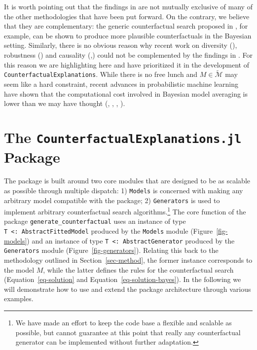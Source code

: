 \documentclass{juliacon}
\begin{document}
It is worth pointing out that the findings in \cite{schut2021generating}
are not mutually exclusive of many of the other methodologies that have
been put forward. On the contrary, we believe that they are
complementary: the generic counterfactual search proposed in
\cite{wachter2017counterfactual}, for example, can be shown to produce
more plausible counterfactuals in the Bayesian setting. Similarly, there
is no obvious reason why recent work on diversity
(\cite{mothilal2020explaining}), robustness (\cite{upadhyay2021towards})
and causality
(\cite{karimi2020algorithmic},\cite{karimi2021algorithmic}) could not be
complemented by the findings in \cite{schut2021generating}. For this
reason we are highlighting \cite{schut2021generating} here and have
prioritized it in the development of
\texttt{CounterfactualExplanations}. While there is no free lunch and
\(M\in\mathcal{\widetilde{M}}\) may seem like a hard constraint, recent
advances in probabilistic machine learning have shown that the
computational cost involved in Bayesian model averaging is lower than we
may have thought (\cite{gal2016dropout},
\cite{lakshminarayanan2016simple}, \cite{daxberger2021laplace},
\cite{murphy2022probabilistic}).

\hypertarget{sec-use}{%
\section{\texorpdfstring{The \texttt{CounterfactualExplanations.jl}
Package}{The CounterfactualExplanations.jl Package}}\label{sec-use}}

The package is built around two core modules that are designed to be as
scalable as possible through multiple dispatch: 1) \texttt{Models} is
concerned with making any arbitrary model compatible with the package;
2) \texttt{Generators} is used to implement arbitrary counterfactual
search algorithms.\footnote{We have made an effort to keep the code base
  a flexible and scalable as possible, but cannot guarantee at this
  point that really any counterfactual generator can be implemented
  without further adaptation.} The core function of the package
\texttt{generate\_counterfactual} uses an instance of type
\texttt{T\ \textless{}:\ AbstractFittedModel} produced by the
\texttt{Models} module (Figure~\ref{fig-models}) and an instance of type
\texttt{T\ \textless{}:\ AbstractGenerator} produced by the
\texttt{Generators} module (Figure~\ref{fig-generators}). Relating this
back to the methodology outlined in Section~\ref{sec-method}, the former
instance corresponds to the model \(M\), while the latter defines the
rules for the counterfactual search (Equation~\ref{eq-solution} and
Equation~\ref{eq-solution-bayes}). In the following we will demonstrate
how to use and extend the package architecture through various examples.
\end{document}
